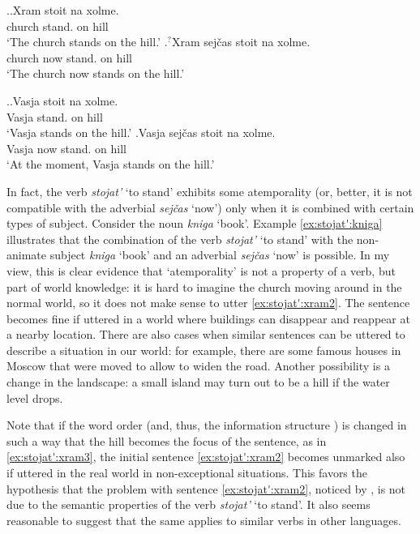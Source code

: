 \ex.\label{ex:stojat':xram}\ag.Xram stoit na xolme.\\
church stand. on hill\\
\trans `The church stands on the hill.'
\bg.\label{ex:stojat':xram2}$^?$Xram sej\v{c}as stoit na xolme.\\
church now stand. on hill\\
\trans `The church now stands on the hill.'

\ex.\label{ex:stojat':Vasja}\ag.Vasja stoit na xolme.\\
Vasja stand. on hill\\
\trans `Vasja stands on the hill.'
\bg.Vasja sej\v{c}as stoit na xolme.\\
Vasja now stand. on hill\\
\trans `At the moment, Vasja stands on the hill.'

In fact, the verb \textit{stojat'} `to stand' exhibits some atemporality (or, better, it is not compatible with the adverbial \textit{sej\v{c}as} `now') only when it is combined with certain types of subject. Consider the noun \textit{kniga} `book'. Example \ref{ex:stojat':kniga} illustrates that the combination of the verb \textit{stojat'} `to stand' with the non-animate subject \textit{kniga} `book' and an adverbial \textit{sej\v{c}as} `now' is possible.  In my view, this is clear evidence that `atemporality' is not a property of a verb, but part of world knowledge: it is hard to imagine the church moving around in the normal world, so it does not make sense to utter \ref{ex:stojat':xram2}. The sentence becomes fine if uttered in a world where buildings can disappear and reappear at a nearby location. There are also cases when similar sentences can be uttered to describe a situation in our world: for example, there are some famous houses in Moscow that were moved to allow to widen the road. Another possibility is a change in the landscape: a small island may turn out to be a hill if the water level drops. 

Note that if the word order (and, thus, the information structure  ) is changed in such a way that the hill becomes the focus of the sentence, as in \ref{ex:stojat':xram3}, the initial sentence \ref{ex:stojat':xram2} becomes unmarked also if uttered in the real world in non-exceptional situations. This favors the hypothesis that the problem with  sentence \ref{ex:stojat':xram2}, noticed by \citet{Paducheva:96}, is not due to the semantic properties of the verb \textit{stojat'} `to stand'. It also seems reasonable to suggest that the same applies to similar verbs in other languages. 

